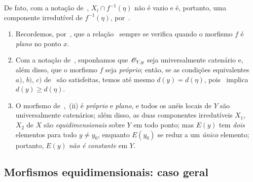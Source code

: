 De fato, com a notação de~, $X_i\cap f^{-1}(\eta)$ não é
vazio e é, portanto, uma componente irredutível de $f^{-1}(\eta)$,
por~.

\begin{remarks}[13.2.12]
\label{IV.13.2.12}
\begin{enumerate}[label=(\roman*)]
  \item Recordemos, por~, que a relação~
  sempre se verifica quando o morfismo $f$ é \emph{plano} no ponto $x$.
  \item Com a notação de~, suponhamos que $\mathscr{O}_{Y,y}$
  seja universalmente catenário e, além disso, que o morfismo $f$ seja
  \emph{próprio}; então, se as condições equivalentes $a)$, $b)$, $c)$
  de~ são satisfeitas, temos até mesmo $d(y)=d(\eta)$,
  pois~ implica $d(y)\geq d(\eta)$.
  \item O morfismo de~,~(ii) é \emph{próprio} e
  \emph{plano}, e todos os anéis locais de $Y$ são universalmente catenários;
  além disso, as duas componentes irredutíveis $X_1$, $X_2$ de $X$ são
  \emph{equidimensionais} sobre $Y$ em todo ponto; mas $E(y)$ tem
  \emph{dois} elementos para todo $y\neq y_0$, enquanto $E(y_0)$ se reduz
  a um \emph{único} elemento; portanto, $E(y)$ \emph{não é constante} em $Y$.
\end{enumerate}
\end{remarks}

\subsection{Morfismos equidimensionais: caso geral}
\label{subsection:IV.13.3}


